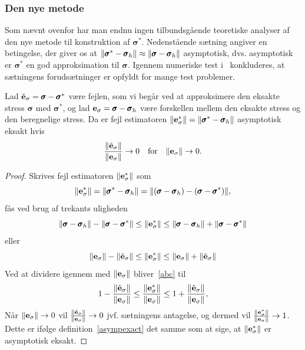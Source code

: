 \subsubsection{Den nye metode}
Som nævnt ovenfor har man endnu ingen tilbundsgående teoretiske
analyser af den nye metode til konstruktion af ${\pmb\sigma}^{\ast}$.
Nedenstående sætning angiver en betingelse, der giver os at
$\|\pmb{\sigma}^{\ast}-\pmb{\sigma}_h\| \approx
\|\pmb{\sigma}-\pmb{\sigma}_h\|$ asymptotisk, dvs. asymptotisk er
$\pmb{\sigma}^{\ast}$ en god approksimation til $\pmb\sigma$. Igennem
numeriske test i~\cite{zz2} konkluderes, at sætningens forudsætninger
er opfyldt for mange test problemer. 
 
\begin{theorem}
Lad $\tilde{\bf e}_\sigma = \pmb{\sigma} - \pmb{\sigma}^{\ast}$ være
fejlen, som vi begår ved at approksimere den eksakte stress
$\pmb\sigma$ med $\pmb{\sigma}^{\ast}$, og lad
${\bf e}_\sigma = \pmb{\sigma} - \pmb{\sigma}_h$ være
forskellen mellem den eksakte stress og den beregnelige stress. Da er
fejl estimatoren $\|{\bf e}_\sigma^{\ast}\|=
\|\pmb{\sigma}^{\ast}-\pmb{\sigma}_h\|$ asymptotisk eksakt hvis
\begin{equation}
  \frac{\|\tilde{{\bf e}}_\sigma\|}{\|{\bf e}_\sigma\|} 
  \rightarrow 0 \quad \text{for} \quad \|{\bf e}_\sigma\|
  \rightarrow 0.
\end{equation}
\end{theorem}
\begin{proof}
Skrives fejl estimatoren $\|{\bf e}_\sigma^{\ast}\|$ som
\begin{equation}
  \|{\bf e}_\sigma^{\ast}\| = 
  \|\pmb{\sigma}^{\ast}-\pmb{\sigma}_h\| =
  \| ( \pmb{\sigma} - \pmb{\sigma}_h ) - 
  ( \pmb{\sigma} - \pmb{\sigma}^{\ast} ) \|,
\end{equation}
fås ved brug af trekants uligheden
\begin{equation}
  \|\pmb{\sigma}-\pmb{\sigma}_h\| -
  \|\pmb{\sigma}-\pmb{\sigma}^{\ast}\| 
  \leq \|{\bf e}_\sigma^{\ast}\| \leq
  \|\pmb{\sigma}-\pmb{\sigma}_h\| +
  \|\pmb{\sigma}-\pmb{\sigma}^{\ast}\|
\end{equation}
eller
\begin{equation} \label{abc}
  \|{\bf e}_\sigma\| - \|\tilde{{\bf e}}_\sigma\|
  \leq \|{\bf e}_\sigma^{\ast}\| \leq
  \|{\bf e}_\sigma\| + \|\tilde{{\bf e}}_\sigma\|
\end{equation}
Ved at dividere igennem med $\|{\bf e}_\sigma\|$ bliver~\eqref{abc}
til 
\begin{equation}
  1 - \frac{\|\tilde{{\bf e}}_\sigma\|}{\|{\bf e}_\sigma\|}
  \leq \frac{\|{\bf e}_\sigma^{\ast}\|}{\|{\bf e}_\sigma\|} \leq
  1 + \frac{\|\tilde{{\bf e}}_\sigma\|}{\|{\bf e}_\sigma\|},
\end{equation}
Når $\|{\bf e}_\sigma\|\rightarrow 0$ vil 
$\frac{\|\tilde{{\bf e}}_\sigma\|}{\|{\bf e}_\sigma\|}\rightarrow 0$
jvf. sætningens antagelse, og dermed vil 
$\frac{\|{\bf e}_\sigma^{\ast}\|}{\|{\bf e}_\sigma\|}\rightarrow 1$.
Dette er ifølge definition~\ref{asympexact} det samme som at sige, at 
$\|{\bf e}_\sigma^{\ast}\|$ er asymptotisk eksakt.
\end{proof}


